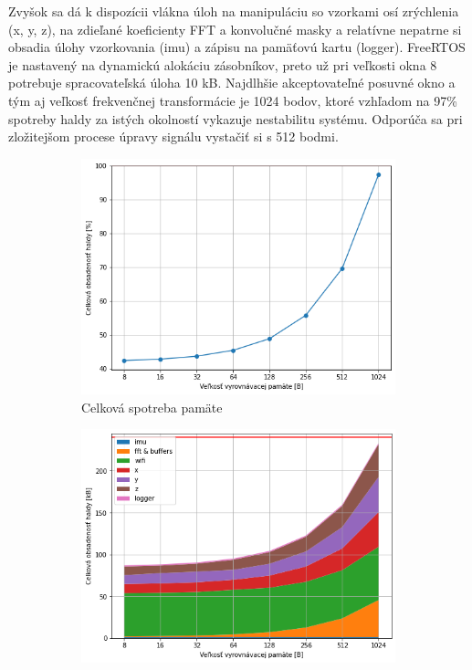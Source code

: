 Zvyšok sa dá k dispozícii vlákna úloh na manipuláciu so vzorkami osí zrýchlenia (x, y, z), na zdieľané koeficienty FFT a
konvolučné masky a  relatívne nepatrne si obsadia úlohy vzorkovania (imu) a zápisu na pamäťovú kartu (logger).
FreeRTOS je nastavený na dynamickú alokáciu zásobníkov, preto už pri veľkosti okna 8 potrebuje spracovateľská úloha 10 kB. Najdlhšie
akceptovateľné posuvné okno a tým aj veľkosť frekvenčnej transformácie je 1024 bodov, ktoré vzhľadom na 97\% spotreby haldy za istých
okolností vykazuje nestabilitu systému. Odporúča sa pri zložitejšom procese úpravy signálu vystačiť si s 512 bodmi.

\begin{figure}[h]
	\centering
     \hfill
     \begin{subfigure}{0.48\textwidth}
        \centering
     	\includegraphics[width=\textwidth]{figures/verification/memory-usage-percentage.png}
     	 \caption{Celková spotreba pamäte}
     	 \label{graph:mem-usage}
     \end{subfigure}
     \hfill
      \begin{subfigure}{0.48\textwidth}
    	\centering
        \includegraphics[width=\textwidth]{figures/verification/memory-profile-bytes.png}

\end{subfigure}
\end{figure}
